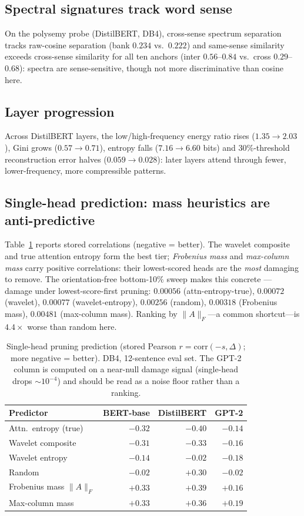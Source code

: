 \documentclass[conference]{IEEEtran}
\begin{document}
\subsection{Spectral signatures track word sense}
On the polysemy probe (DistilBERT, DB4), cross-sense spectrum separation
tracks raw-cosine separation (bank $0.234$ vs.\ $0.222$) and same-sense
similarity exceeds cross-sense similarity for all ten anchors
(inter $0.56$--$0.84$ vs.\ cross $0.29$--$0.68$): spectra are
sense-sensitive, though not more discriminative than cosine here.

\subsection{Layer progression}
Across DistilBERT layers, the low/high-frequency energy ratio rises
($1.35\rightarrow2.03$), Gini grows ($0.57\rightarrow0.71$), entropy
falls ($7.16\rightarrow6.60$ bits) and 30\%-threshold reconstruction
error halves ($0.059\rightarrow0.028$): later layers attend through
fewer, lower-frequency, more compressible patterns.

\subsection{Single-head prediction: mass heuristics are anti-predictive}
\label{sec:singlehead}
Table~\ref{tab:singlehead} reports stored correlations (negative =
better). The wavelet composite and true attention entropy form the best
tier; \emph{Frobenius mass} and \emph{max-column mass} carry positive
correlations: their lowest-scored heads are the \emph{most} damaging to
remove. The orientation-free bottom-10\% sweep makes this concrete ---
damage under lowest-score-first pruning:
$0.00056$ (attn-entropy-true), $0.00072$ (wavelet),
$0.00077$ (wavelet-entropy), $0.00256$ (random), $0.00318$
(Frobenius mass), $0.00481$ (max-column mass). Ranking by
$\lVert A\rVert_F$---a common shortcut---is $4.4\times$ worse than
random here.

\begin{table}[t]
\centering
\caption{Single-head pruning prediction (stored Pearson
$r=\mathrm{corr}(-s,\Delta)$; more negative = better). DB4,
12-sentence eval set. The GPT-2 column is computed on a near-null
damage signal (single-head drops ${\sim}10^{-4}$) and should be read
as a noise floor rather than a ranking.}
\label{tab:singlehead}
\begin{tabular}{lrrr}
\toprule
Predictor & BERT-base & DistilBERT & GPT-2 \\
\midrule
Attn.\ entropy (true) & $-0.32$ & $\mathbf{-0.40}$ & $-0.14$ \\
Wavelet composite     & $\mathbf{-0.31}$ & $-0.33$ & $-0.16$ \\
Wavelet entropy       & $-0.14$ & $-0.02$ & $-0.18$ \\
Random                & $-0.02$ & $+0.30$ & $-0.02$ \\
Frobenius mass $\lVert A\rVert_F$ & $+0.33$ & $+0.39$ & $+0.16$ \\
Max-column mass       & $+0.33$ & $+0.36$ & $+0.19$ \\
\bottomrule
\end{tabular}
\end{table}
\end{document}
